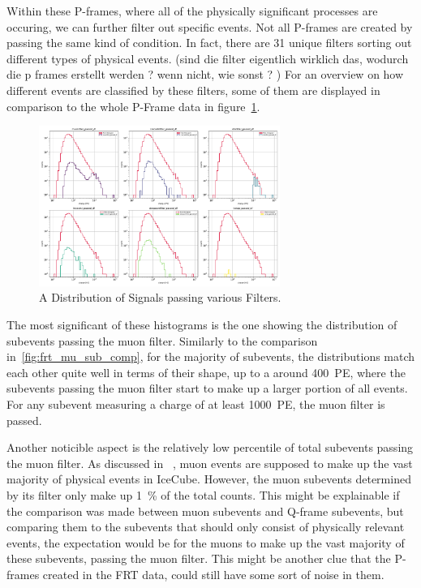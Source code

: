 Within these P-frames, where all of the physically significant processes are occuring, we can further filter out specific events. Not all P-frames are created by 
passing the same kind of condition. In fact, there are \num{31} unique filters sorting out different types of physical events. (sind die filter eigentlich wirklich 
das, wodurch die p frames erstellt werden ? wenn nicht, wie sonst ? )
For an overview on how different events are classified by these filters, some of them are displayed in comparison to the whole P-Frame data in 
figure~\ref{fig:filtermask}. 

\begin{figure}
    \centering
    \includegraphics[width=0.7\textwidth]{Plots/selected_filters_subplot.pdf}
    \caption{A Distribution of Signals passing various Filters.}
    \label{fig:filtermask}
\end{figure}

The most significant of these histograms is the one showing the distribution of subevents passing the muon filter. 
Similarly to the comparison in~\ref{fig:frt_mu_sub_comp}, for the majority of subevents, the distributions match each other quite well in terms of their shape, up 
to a around \num{400}~\unit{PE}, where the subevents passing the muon filter start to make up a larger portion of all events. For any subevent measuring a charge of 
at least \num{1000}~\unit{PE}, the muon filter is passed.  

Another noticible aspect is the relatively low percentile of total subevents passing the muon filter. As discussed in ~\cite{einstein}, muon events are supposed to make 
up the vast majority of physical events in IceCube. However, the muon subevents determined by its filter only make up \SI{1}{\percent} of the total counts. 
This might be explainable if the comparison was made between muon subevents and Q-frame subevents, but comparing them to the subevents that should only consist of  
physically relevant events, the expectation would be for the muons to make up the vast majority of these subevents, passing the muon filter. This might be another clue 
that the P-frames created in the FRT data, could still have some sort of noise in them. 

